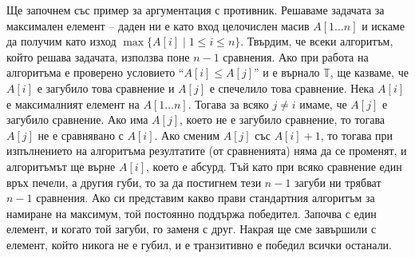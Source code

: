 \documentclass{article}
\newcommand{\T}{\mathbb{T}}
\theoremstyle{definition}
\theoremstyle{plain}
\theoremstyle{remark}
\theoremstyle{definition}
\begin{document}
Ще започнем със пример за аргументация с противник.
Решаваме задачата за максимален елемент -- даден ни е като вход целочислен масив $A[1 \dots n]$ и искаме да получим като изход $\max \{ A[i] \mid 1 \leq i \leq n \}$.
Твърдим, че всеки алгоритъм, който решава задачата, използва поне $n - 1$ сравнения.
Ако при работа на алгоритъма е проверено условието ``$A[i] \leq A[j]$'' и е върнало $\T$, ще казваме, че $A[i]$ е загубило това сравнение и $A[j]$ е спечелило това сравнение.
Нека $A[i]$ е максималният елемент на $A[1 \dots n]$.
Тогава за всяко $j \neq i$ имаме, че $A[j]$ е загубило сравнение.
Ако има $A[j]$, което не е загубило сравнение, то тогава $A[j]$ не е сравнявано с $A[i]$.
Ако сменим $A[j]$ със $A[i] + 1$, то тогава при изпълнението на алгоритъма резултатите (от сравненията) няма да се променят, и алгоритъмът ще върне $A[i]$, което е абсурд.
Тъй като при всяко сравнение един връх печели, а другия губи, то за да постигнем тези $n - 1$ загуби ни трябват $n - 1$ сравнения.
Ако си представим какво прави стандартния алгоритъм за намиране на максимум, той постоянно поддържа победител.
Започва с един елемент, и когато той загуби, го заменя с друг.
Накрая ще сме завършили с елемент, който никога не е губил, и е транзитивно е победил всички останали.
\end{document}
